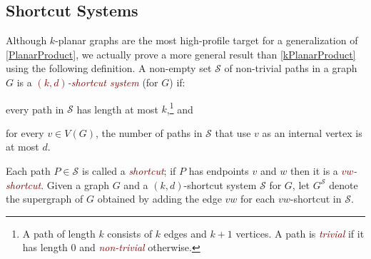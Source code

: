 \documentclass{patmorin}
\theoremstyle{plain}
\theoremstyle{definition}
\newcommand{\defin}[1]{\textcolor{Maroon}{\emph{#1}}}
\newcommand{\note}[2]{\noindent{\color{red}[#1:~#2]}}
\newcommand{\referee}[2]{\noindent\textcolor{blue}{\framebox{\begin{minipage}{\textwidth} Ref \#{#1}: #2\end{minipage}}}}
\renewcommand{\SS}{\mathcal{S}}
\begin{document}
%
%

%
%
%

\subsection{Shortcut Systems}

Although $k$-planar graphs are the most high-profile target for a generalization of \cref{PlanarProduct}, we actually prove a more general result than \cref{kPlanarProduct} using the following definition. A non-empty set $\SS$ of non-trivial paths in a graph $G$ is a \defin{$(k,d)$-shortcut system} (for $G$) if:

\begin{compactitem}
\item every path in $\SS$ has length at most $k$,\footnote{A path of length $k$ consists of $k$ edges and $k+1$ vertices.  A path is \defin{trivial} if it has length 0 and \defin{non-trivial} otherwise.} and
\item for every $v\in V(G)$, the number of paths in $\SS$ that use $v$ as an internal vertex is at most $d$.
\end{compactitem}
Each path $P\in\SS$ is called a \defin{shortcut}; if $P$ has endpoints $v$ and $w$ then it is a \defin{$vw$-shortcut}. Given a graph $G$ and a $(k,d)$-shortcut system $\SS$ for $G$, let $G^{\SS}$ denote the supergraph of $G$ obtained by adding the edge $vw$ for each $vw$-shortcut in $\SS$.
\end{document}

